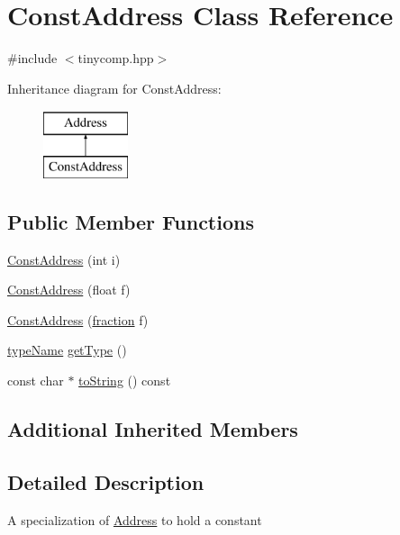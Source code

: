\hypertarget{class_const_address}{}\section{Const\+Address Class Reference}
\label{class_const_address}


{\ttfamily \#include $<$tinycomp.\+hpp$>$}

Inheritance diagram for Const\+Address\+:\begin{figure}[H]
\begin{center}
\leavevmode
\includegraphics[height=2.000000cm]{class_const_address}
\end{center}
\end{figure}
\subsection*{Public Member Functions}
\begin{DoxyCompactItemize}
\item 
\hyperlink{class_const_address_a3d31b1ad98928a7ab901342651dba352}{Const\+Address} (int i)
\item 
\hyperlink{class_const_address_a7dd2528a30edf7981839455a7817903d}{Const\+Address} (float f)
\item 
\hyperlink{class_const_address_ad8a58bb142ffafd1c375820db95490be}{Const\+Address} (\hyperlink{structfraction}{fraction} f)
\item 
\hyperlink{tinycomp_8h_aca554671f4620139c1393f96d2af74bc}{type\+Name} \hyperlink{class_const_address_a59180f99dc2d75f52c76d3aa2100ab85}{get\+Type} ()
\item 
const char $\ast$ \hyperlink{class_const_address_ae5c661e2c7033c192d493d8345ea6c75}{to\+String} () const 
\end{DoxyCompactItemize}
\subsection*{Additional Inherited Members}


\subsection{Detailed Description}
A specialization of \hyperlink{class_address}{Address} to hold a constant 

